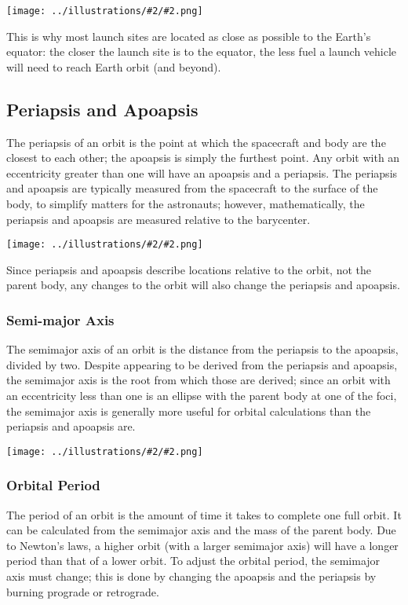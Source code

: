 \documentclass[oneside,a5paper]{book}
\newcommand{\widthillustration}[2]{{\centering\texttt{[image: ../illustrations/\#2/\#2.png]}}}
\newcommand{\illustration}[1]{\widthillustration{\linewidth}{#1}}
\begin{document}
\illustration{latitude-velocity}

This is why most launch sites are located as close as possible to the
Earth’s equator: the closer the launch site is to the equator, the
less fuel a launch vehicle will need to reach Earth orbit (and
beyond).

\subsection{Periapsis and Apoapsis}

The periapsis of an orbit is the point at which the spacecraft and
body are the closest to each other; the apoapsis is simply the
furthest point. Any orbit with an eccentricity greater than one will
have an apoapsis and a periapsis. The periapsis and apoapsis are
typically measured from the spacecraft to the surface of the body, to
simplify matters for the astronauts; however, mathematically, the
periapsis and apoapsis are measured relative to the barycenter.

\illustration{periapsis-apoapsis}

Since periapsis and apoapsis describe locations relative to the orbit,
not the parent body, any changes to the orbit will also change the
periapsis and apoapsis.

\subsubsection{Semi-major Axis}

The semimajor axis of an orbit is the distance from the periapsis to
the apoapsis, divided by two. Despite appearing to be derived from the
periapsis and apoapsis, the semimajor axis is the root from which
those are derived; since an orbit with an eccentricity less than one
is an ellipse with the parent body at one of the foci, the semimajor
axis is generally more useful for orbital calculations than the
periapsis and apoapsis are.

\illustration{semimajor-axis}

\subsubsection{Orbital Period}

The period of an orbit is the amount of time it takes to complete one
full orbit. It can be calculated from the semimajor axis and the mass
of the parent body. Due to Newton’s laws, a higher orbit (with a
larger semimajor axis) will have a longer period than that of a lower
orbit. To adjust the orbital period, the semimajor axis must change;
this is done by changing the apoapsis and the periapsis by burning
prograde or retrograde.
\end{document}
